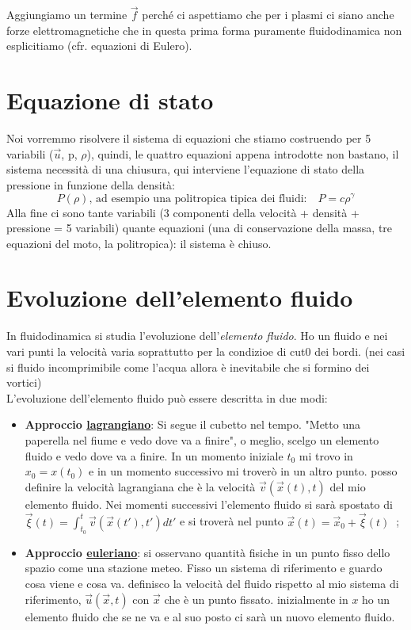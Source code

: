 Aggiungiamo un termine $\vec f$ perché ci aspettiamo che per i plasmi ci siano anche forze elettromagnetiche che in questa prima forma puramente fluidodinamica non esplicitiamo (cfr. equazioni di Eulero).

%
%
%
\vspace{0.5cm}
\section{Equazione di stato}
Noi vorremmo risolvere il sistema di equazioni che stiamo costruendo per 5 variabili ($\vec u$, p, $\rho$), quindi, le quattro equazioni appena introdotte non bastano, il sistema necessità di una chiusura, qui interviene l'equazione di stato della pressione in funzione della densità:
\begin{equation}
	\label{polytropic}
	P(\rho),\, \text{ad esempio una politropica tipica dei fluidi:} \quad P = c \rho^\gamma
\end{equation}
Alla fine ci sono tante variabili (3 componenti della velocità + densità + pressione = 5 variabili) quante equazioni (una di conservazione della massa, tre equazioni del moto, la politropica): il sistema è chiuso. 


\section{Evoluzione dell'elemento fluido} 
In fluidodinamica si studia l'evoluzione dell'\textit{elemento fluido}. Ho un fluido e nei vari punti la velocità varia  soprattutto per la condizioe di cut0 dei bordi. (nei casi si fluido incomprimibile come l'acqua allora è inevitabile che si formino dei vortici)\\L'evoluzione dell'elemento fluido  può essere descritta in due modi:
\begin{itemize}
	\item \textbf{Approccio \underline{lagrangiano}}: Si segue il cubetto nel tempo.  "Metto una paperella nel fiume e vedo dove va a finire", o meglio, scelgo un elemento fluido e vedo dove va a finire. In un momento iniziale $t_0$ mi trovo in $x_0=x(t_0)$ e in un momento successivo mi troverò in un altro punto. posso definire la velocità lagrangiana che è la velocità $\vec v(\vec x(t),t)$ del mio elemento fluido. Nei momenti successivi l'elemento fluido si sarà spostato di $\vec \xi (t)=\int_{t_0}^t\vec v(\vec x(t'),t')dt'$ e si troverà nel punto \(\vec x(t)=\vec x_0+\vec \xi(t)\ \) ;
	\item \textbf{Approccio \underline{euleriano}}: si osservano quantità fisiche in un punto fisso dello spazio come una stazione meteo. Fisso un sistema di riferimento e guardo cosa viene e cosa va.  definisco la velocità del fluido rispetto al mio sistema di riferimento, $\vec u(\vec x,t)$ con $\vec x $ che è un punto fissato. inizialmente in $x$ ho un elemento fluido che se ne va e al suo posto ci sarà un nuovo elemento fluido.
\end{itemize}



